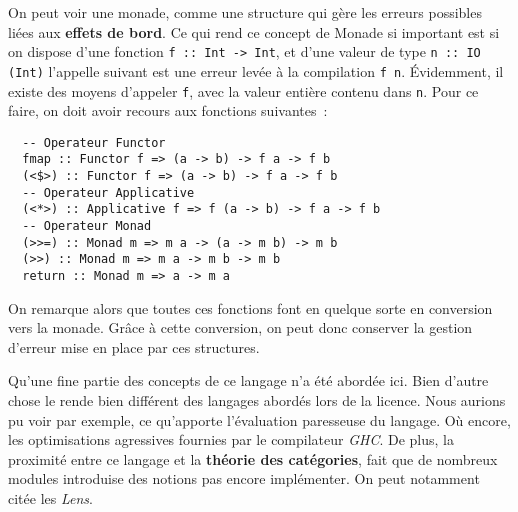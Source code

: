 
On peut voir une monade, comme une structure qui gère les erreurs possibles 
liées aux \textbf{effets de bord}. Ce qui rend ce concept de Monade si 
important est si on dispose d'une fonction 
\texttt{f :: Int -> Int}, et d'une valeur de type 
\texttt{n :: IO (Int)} l'appelle suivant est une erreur levée à la 
compilation \texttt{f n}. Évidemment, il existe des moyens 
d'appeler \texttt{f}, avec la valeur entière contenu dans 
\texttt{n}. Pour ce faire, on doit avoir recours aux fonctions 
suivantes~: 

\begin{verbatim}
  -- Operateur Functor
  fmap :: Functor f => (a -> b) -> f a -> f b
  (<$>) :: Functor f => (a -> b) -> f a -> f b
  -- Operateur Applicative
  (<*>) :: Applicative f => f (a -> b) -> f a -> f b
  -- Operateur Monad
  (>>=) :: Monad m => m a -> (a -> m b) -> m b
  (>>) :: Monad m => m a -> m b -> m b
  return :: Monad m => a -> m a
\end{verbatim}

On remarque alors que toutes ces fonctions font en quelque sorte en conversion 
vers la monade. Grâce à cette conversion, on peut donc conserver la gestion 
d'erreur mise en place par ces structures.

Qu'une fine partie des concepts de ce langage n'a été abordée ici. Bien d'autre
chose le rende bien différent des langages abordés lors de la licence. Nous 
aurions pu voir par exemple, ce qu'apporte l'évaluation paresseuse du langage. 
Où encore, les optimisations agressives fournies par le compilateur 
\textit{GHC}. De plus, la proximité entre ce langage et la 
\textbf{théorie des catégories}, fait que de nombreux modules introduise des 
notions pas encore implémenter. On peut notamment citée les \textit{Lens}.
